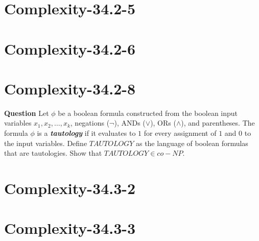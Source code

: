 \documentclass[12pt]{article}
\begin{document}
\section{Complexity-34.2-5}

\section{Complexity-34.2-6}

\section{Complexity-34.2-8}
\textbf{Question}
Let $\phi$ be a boolean formula constructed from the boolean input variables $x_1, x_2, \dots, x_k$, negations ($\neg$), ANDs ($\vee$), ORs ($\wedge$), and parentheses. The formula $\phi$ is a \textit{\textbf{tautology}} if it evaluates to $1$ for every assignment of $1$ and $0$ to the input variables. Define $TAUTOLOGY$ as the language of boolean formulas that are tautologies. Show that $TAUTOLOGY \in co-NP$.


\section{Complexity-34.3-2}

\section{Complexity-34.3-3}
\end{document}
